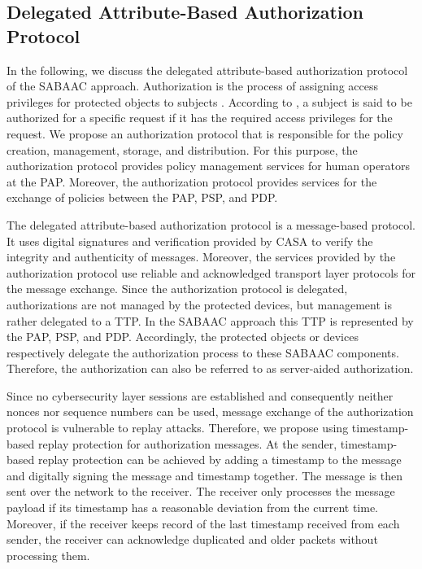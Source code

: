 \subsection{Delegated Attribute-Based Authorization Protocol}
\label{sec:approach:sabaac:authorization}
In the following, we discuss the delegated attribute-based authorization protocol of the SABAAC approach.
Authorization is the process of assigning access privileges for protected objects to subjects \cite{Eckert2023}.
According to \citeauthor{Eckert2023} \cite{Eckert2023}, a subject is said to be authorized for a specific request if it has the required access privileges for the request.
We propose an authorization protocol that is responsible for the policy creation, management, storage, and distribution.
For this purpose, the authorization protocol provides policy management services for human operators at the PAP.
Moreover, the authorization protocol provides services for the exchange of policies between the PAP, PSP, and PDP.

The delegated attribute-based authorization protocol is a message-based protocol.
It uses digital signatures and verification provided by CASA to verify the integrity and authenticity of messages.
Moreover, the services provided by the authorization protocol use reliable and acknowledged transport layer protocols for the message exchange.
Since the authorization protocol is delegated, authorizations are not managed by the protected devices, but management is rather delegated to a TTP.
In the SABAAC approach this TTP is represented by the PAP, PSP, and PDP.
Accordingly, the protected objects or devices respectively delegate the authorization process to these SABAAC components.
Therefore, the authorization can also be referred to as server-aided authorization.

Since no cybersecurity layer sessions are established and consequently neither nonces nor sequence numbers can be used, message exchange of the authorization protocol is vulnerable to replay attacks.
Therefore, we propose using timestamp-based replay protection for authorization messages.
At the sender, timestamp-based replay protection can be achieved by adding a timestamp to the message and digitally signing the message and timestamp together.
The message is then sent over the network to the receiver.
The receiver only processes the message payload if its timestamp has a reasonable deviation from the current time.
Moreover, if the receiver keeps record of the last timestamp received from each sender, the receiver can acknowledge duplicated and older packets without processing them.

